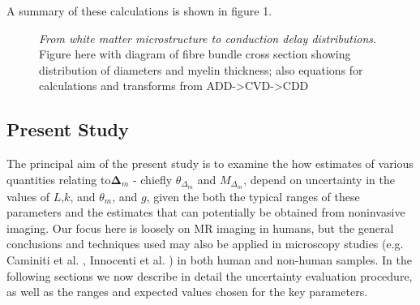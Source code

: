 A summary of these calculations is shown in figure 1. 





\begin{figure}[h!]
\begin{center}
\end{center}
\caption[\emph{From white matter microstructure to conduction delay distributions}]{\emph{From white matter microstructure to conduction delay distributions}. Figure here with diagram of fibre bundle cross section showing distribution of diameters and myelin thickness; also equations for calculations and transforms from ADD->CVD->CDD} \label{fig:1}
\end{figure}



\subsection{Present Study}

The principal aim of the present study is to examine the how estimates of various quantities relating to$\mathbf{\Delta}_m$ - chiefly $\theta_{\Delta_m}$ and $M_{\Delta_m}$, depend on uncertainty in the values of $L$,$k$, and $\theta_m$, and $g$, given the both the typical ranges of these parameters and the estimates that can potentially be obtained from noninvasive imaging. Our focus here is loosely on MR imaging in humans, but the general conclusions and techniques used may also be applied in microscopy studies (e.g. Caminiti et al. , Innocenti et al. ) in both human and non-human samples. In the following sections we now describe in detail the uncertainty evaluation procedure, as well as the ranges and expected values chosen for the key parameters. 


 
